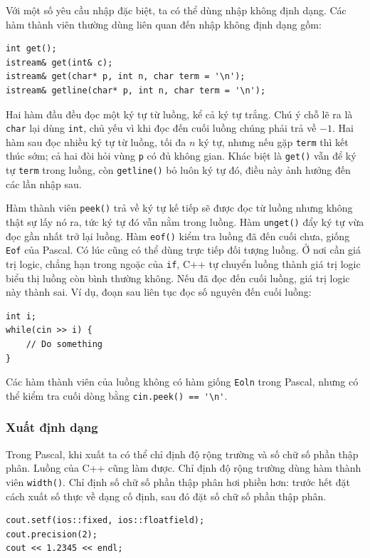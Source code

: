 \documentclass[11pt]{article}
\newcommand{\cpp}{C++}
\newcommand{\pascal}{Pascal}
\begin{document}
Với một số yêu cầu nhập đặc biệt, ta có thể dùng nhập không định dạng. Các
hàm thành viên thường dùng liên quan đến nhập không định dạng gồm:

\begin{verbatim}
int get();
istream& get(int& c);
istream& get(char* p, int n, char term = '\n');
istream& getline(char* p, int n, char term = '\n');
\end{verbatim}

Hai hàm đầu đều đọc một ký tự từ luồng, kể cả ký tự trắng. Chú ý chỗ lẽ ra
là \verb|char| lại dùng \verb|int|, chủ yếu vì khi đọc đến cuối luồng chúng
phải trả về \(-1\). Hai hàm sau đọc nhiều ký tự từ luồng, tối đa \(n\) ký tự,
nhưng nếu gặp \verb|term| thì kết thúc sớm; cả hai đòi hỏi vùng \verb|p| có
đủ không gian. Khác biệt là \verb|get()| vẫn để ký tự \verb|term| trong luồng,
còn \verb|getline()| bỏ luôn ký tự đó, điều này ảnh hưởng đến các lần nhập
sau.

Hàm thành viên \verb|peek()| trả về ký tự kế tiếp sẽ được đọc từ luồng nhưng
không thật sự lấy nó ra, tức ký tự đó vẫn nằm trong luồng. Hàm \verb|unget()|
đẩy ký tự vừa đọc gần nhất trở lại luồng. Hàm \verb|eof()| kiểm tra luồng đã
đến cuối chưa, giống \verb|Eof| của \pascal{}. Có lúc cũng có thể dùng trực
tiếp đối tượng luồng. Ở nơi cần giá trị logic, chẳng hạn trong ngoặc của
\verb|if|, \cpp{} tự chuyển luồng thành giá trị logic biểu thị luồng còn bình
thường không. Nếu đã đọc đến cuối luồng, giá trị logic này thành sai. Ví dụ,
đoạn sau liên tục đọc số nguyên đến cuối luồng:

\begin{verbatim}
int i;
while(cin >> i) {
    // Do something
}
\end{verbatim}

Các hàm thành viên của luồng không có hàm giống \verb|Eoln| trong \pascal{},
nhưng có thể kiểm tra cuối dòng bằng \verb|cin.peek() == '\n'|.

\subsubsection*{Xuất định dạng}

Trong \pascal{}, khi xuất ta có thể chỉ định độ rộng trường và số chữ số phần
thập phân. Luồng của \cpp{} cũng làm được. Chỉ định độ rộng trường dùng hàm
thành viên \verb|width()|. Chỉ định số chữ số phần thập phân hơi phiền hơn:
trước hết đặt cách xuất số thực về dạng cố định, sau đó đặt số chữ số phần
thập phân.

\begin{verbatim}
cout.setf(ios::fixed, ios::floatfield);
cout.precision(2);
cout << 1.2345 << endl;
\end{verbatim}
\end{document}
